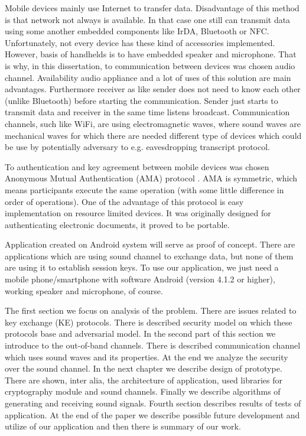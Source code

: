 \documentclass[11pt,titlepage]{article}
\theoremstyle{plain}
\begin{document}
Mobile devices mainly use Internet to transfer data. Disadvantage of this method is that network not always is available. In that case one still can transmit data using some another embedded components like IrDA, Bluetooth or NFC. Unfortunately, not every device has these kind of accessories implemented. However, basis of handhelds is to have embedded speaker and microphone. That is why, in this dissertation, to communication between devices was chosen audio channel. Availability audio appliance and a lot of uses of this solution are main advantages. Furthermore receiver as like sender does not need to know each other (unlike Bluetooth) before starting the communication. Sender just starts to transmit data and receiver in the same time listens broadcast. Communication channels, such like WiFi, are using electromagnetic waves, where sound waves are mechanical waves for which there are needed different type of devices which could be use by potentially adversary to e.g. eavesdropping transcript protocol.

\vspace{5mm}

To authentication and key agreement between mobile devices was chosen Anonymous Mutual Authentication (AMA) protocol \cite{AMA}. AMA is symmetric, which means  participants execute the same operation (with some little difference in order of operations). One of
the advantage of this protocol is easy implementation on resource limited devices. It was originally designed for authenticating electronic documents, it proved to be portable.

\vspace{5mm}

Application created on Android system will serve as proof of concept. There are applications which are using sound channel to exchange data, but none of them are using it to establish session keys. To use our application, we just need a mobile phone/smartphone with software Android (version 4.1.2 or higher), working speaker and microphone, of course.

\vspace{5mm}

The first section we focus on analysis of the problem. There are issues related to key exchange (KE) protocols. There is described security model on which these protocols base and adversarial model. In the second part of this section we introduce to the out-of-band channels. There is described communication channel which uses sound waves and its properties. At the end we analyze the security over the sound channel. In the next chapter we describe design of prototype. There are shown, inter alia, the architecture of application, used libraries for cryptography module and sound channels. Finally we describe algorithms of generating and receiving sound signals. Fourth section describes results of tests of application. At the end of the paper we describe possible future development and utilize of our application and then there is summary of our work.
\end{document}
